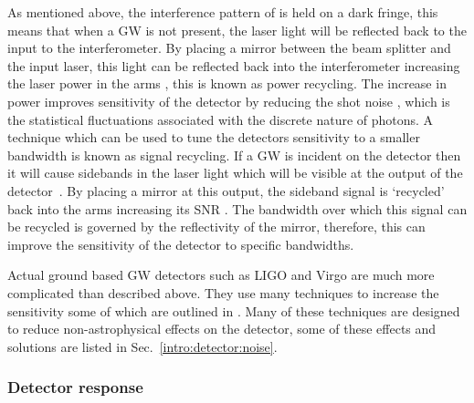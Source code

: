 As mentioned above, the interference pattern of is held on a dark fringe, this
means that when a \gls{GW} is not present, the laser light will be reflected
back to the input to the interferometer.  By placing a mirror between the beam
splitter and the input laser, this light can be reflected back into the
interferometer increasing the laser power in the arms
\citep{pitkin2011GravitationalWave}, this is known as power recycling. The
increase in power improves sensitivity of the detector by reducing the shot
noise \citep{abbott2009LIGOLaser}, which is the statistical fluctuations
associated with the discrete nature of photons.  A technique which can be used
to tune the detectors sensitivity to a smaller bandwidth is known as signal
recycling.  If a \gls{GW} is incident on the detector then it will cause
sidebands in the laser light which will be visible at the output of the
detector~.
By placing a mirror at this output, the sideband signal is `recycled' back into
the arms increasing its \gls{SNR} \citep{pitkin2011GravitationalWave}. The
bandwidth over which this signal can be recycled is governed by the
reflectivity of the mirror, therefore, this can improve the sensitivity of the
detector to specific bandwidths. 

Actual ground based \gls{GW} detectors such as \gls{LIGO} \citep{abbott2009LIGOLaser} and
Virgo \citep{acernese2015AdvancedVirgo} are much more complicated than
described above.  They use many techniques to increase the sensitivity some of
which are outlined in \citep{aasi2015AdvancedLIGO,abbott2009LIGOLaser}.  Many of these techniques are
designed to reduce non-astrophysical effects on the detector,
some of these effects and solutions are listed in
Sec.~\ref{intro:detector:noise}.

\subsubsection{\label{intro:detector:response}Detector response}

